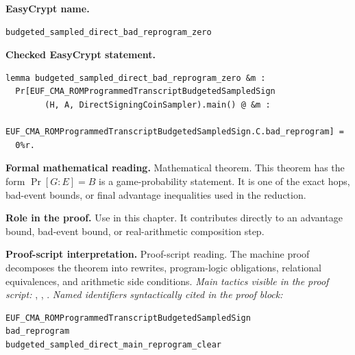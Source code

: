 \begin{formaltheorem}
\noindent\textbf{EasyCrypt name.}
\begin{lstlisting}[language=EasyCrypt,basicstyle=\ttfamily\scriptsize]
budgeted_sampled_direct_bad_reprogram_zero
\end{lstlisting}
\noindent\textbf{Checked EasyCrypt statement.}
\begin{lstlisting}[language=EasyCrypt,basicstyle=\ttfamily\scriptsize]
lemma budgeted_sampled_direct_bad_reprogram_zero &m :
  Pr[EUF_CMA_ROMProgrammedTranscriptBudgetedSampledSign
        (H, A, DirectSigningCoinSampler).main() @ &m :
    EUF_CMA_ROMProgrammedTranscriptBudgetedSampledSign.C.bad_reprogram] =
  0%r.
\end{lstlisting}
\noindent\textbf{Formal mathematical reading.}
Mathematical theorem. This theorem has the form \(\Pr[G:E] = B\) is a game-probability statement.  It is one of the exact hops, bad-event bounds, or final advantage inequalities used in the reduction.

\noindent\textbf{Role in the proof.}
Use in this chapter. It contributes directly to an advantage bound, bad-event bound, or real-arithmetic composition step.

\noindent\textbf{Proof-script interpretation.}
Proof-script reading. The machine proof decomposes the theorem into rewrites, program-logic obligations, relational equivalences, and arithmetic side conditions.
\emph{Main tactics visible in the proof script:} , , .
\emph{Named identifiers syntactically cited in the proof block:}
\begin{lstlisting}[language=EasyCrypt,basicstyle=\ttfamily\scriptsize]
EUF_CMA_ROMProgrammedTranscriptBudgetedSampledSign
bad_reprogram
budgeted_sampled_direct_main_reprogram_clear
\end{lstlisting}

\end{formaltheorem}


